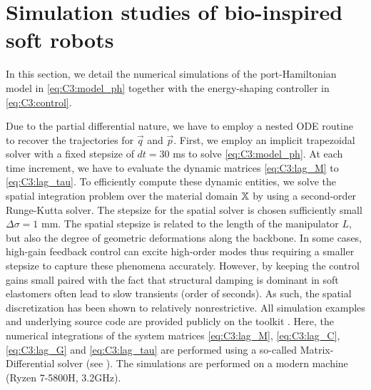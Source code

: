 \section{Simulation studies of bio-inspired soft robots} \label{sec:chap3_result}
In this section, we detail the numerical simulations of the port-Hamiltonian model in \eqref{eq:C3:model_ph} together with the energy-shaping controller in \eqref{eq:C3:control}. 

Due to the partial differential nature, we have to employ a nested ODE routine to recover the trajectories for $\vec{q}$ and $\vec{p}$. First, we employ an implicit trapezoidal solver with a fixed stepsize of $dt = 30 $ ms to solve \eqref{eq:C3:model_ph}. At each time increment, we have to evaluate the dynamic matrices \eqref{eq:C3:lag_M} to \eqref{eq:C3:lag_tau}. To efficiently compute these dynamic entities, we solve the spatial integration problem over the material domain $\mathbb{X}$ by using a second-order Runge-Kutta solver.  The stepsize for the spatial solver is chosen sufficiently small $\Delta \sigma = 1$ mm. The spatial stepsize is related to the length of the manipulator $L$, but also the degree of geometric deformations along the backbone. In some cases, high-gain feedback control can excite high-order modes thus requiring a smaller stepsize to capture these phenomena accurately. However, by keeping the control gains small paired with the fact that structural damping is dominant in soft elastomers often lead to slow transients (order of seconds). As such, the spatial discretization has been shown to relatively nonrestrictive. %
All simulation examples and underlying source code are provided publicly on the \sorotoki toolkit \cite{Caasenbrood2020}. Here, the numerical integrations of the system matrices \eqref{eq:C3:lag_M}, \eqref{eq:C3:lag_C}, \eqref{eq:C3:lag_G} and \eqref{eq:C3:lag_tau} are performed using a so-called Matrix-Differential solver (see \cite{Caasenbrood2022}). The simulations are performed on a modern machine (Ryzen 7-5800H, 3.2GHz).

